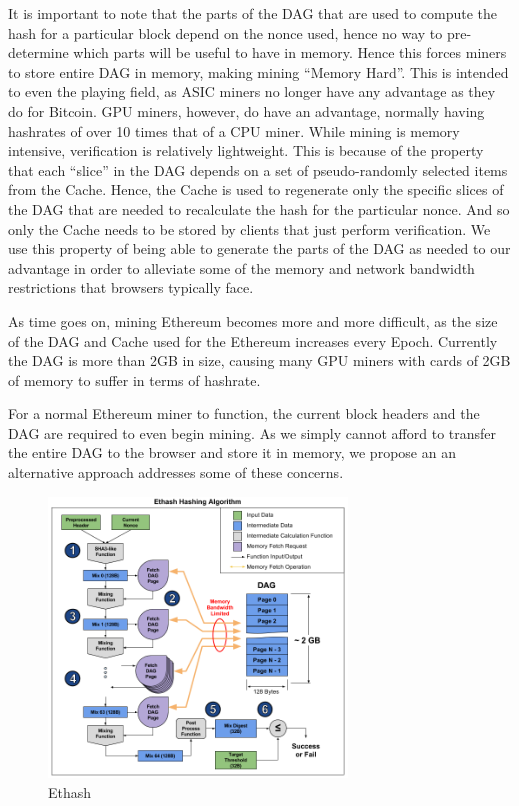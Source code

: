 \documentclass[runningheads]{llncs}
\begin{document}
It is important to note that the parts of the DAG that are used to compute the hash for a particular block depend on the nonce used, hence no way to pre-determine which parts will be useful to have in memory. Hence this forces miners to store entire DAG in memory, making mining ``Memory Hard''. This is intended to even the playing field, as ASIC miners no longer have any advantage as they do for Bitcoin. GPU miners, however, do have an advantage, normally having hashrates of over 10 times that of a CPU miner.
While mining is memory intensive, verification is relatively lightweight. This is because of the property that each ``slice'' in the DAG depends on a set of pseudo-randomly selected items from the Cache. Hence, the Cache is used to regenerate only the specific slices of the DAG that are needed to recalculate the hash for the particular nonce. And so only the Cache needs to be stored by clients that just perform verification. We use this property of being able to generate the parts of the DAG as needed to our advantage in order to alleviate some of the memory and network bandwidth restrictions that browsers typically face.

As time goes on, mining Ethereum becomes more and more difficult, as the size of the DAG and Cache used for the Ethereum increases every Epoch. Currently the DAG is more than 2GB in size, causing many GPU miners with cards of 2GB of memory to suffer in terms of hashrate. 

For a normal Ethereum miner to function, the current block headers and the DAG are required to even begin mining. As we simply cannot afford to transfer the entire DAG to the browser and store it in memory, we propose an an alternative approach addresses some of these concerns.

\begin{figure}[h]
\centering
\includegraphics[width=300px,keepaspectratio]{ethash_algorithm.png}
\caption{\label{fig:ethash} Ethash}
\end{figure}
\end{document}
